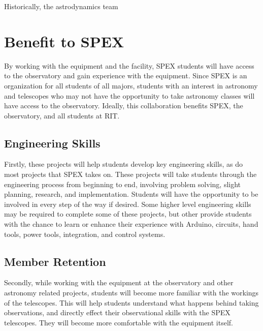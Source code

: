 \documentclass[conference]{IEEEtran} %
\begin{document}
  Historically, the astrodynamics team 

\section{Benefit to SPEX}
\label{sec:benefit}
By working with the equipment and the facility, SPEX students will have access to the observatory and gain experience with the equipment. Since SPEX is an organization for all students of all majors, students with an interest in astronomy and telescopes who may not have the opportunity to take astronomy classes will have access to the observatory. Ideally, this collaboration benefits SPEX, the observatory, and all students at RIT.



\subsection{Engineering Skills}
\label{subsec:mindset}
Firstly, these projects will help students develop key engineering skills, as do most projects that SPEX takes on. These projects will take students through the engineering process from beginning to end, involving problem solving, slight planning, research, and implementation. Students will have the opportunity to be involved in every step of the way if desired. Some higher level engineering skills may be required to complete some of these projects, but other provide students with the chance to learn or enhance their experience with Arduino, circuits, hand tools, power tools, integration, and control systems. 

\subsection{Member Retention}
\label{subsec:traceability}
Secondly, while working with the equipment at the observatory and other astronomy related projects, students will become more familiar with the workings of the telescopes. This will help students understand what happens behind taking observations, and directly effect their observational skills with the SPEX telescopes. They will become more comfortable with the equipment itself.
\end{document}
